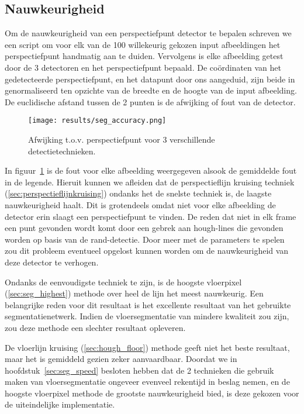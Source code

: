 \subsection{Nauwkeurigheid}
Om de nauwkeurigheid van een perspectiefpunt detector te bepalen schreven we een script om voor elk van de 100 willekeurig gekozen input afbeeldingen
het perspectiefpunt handmatig aan te duiden.
Vervolgens is elke afbeelding getest door de 3 detectoren en het perspectiefpunt bepaald.
De co\"{o}rdinaten van het gedetecteerde perspectiefpunt, en het datapunt door ons aangeduid, zijn beide in genormaliseerd ten opzichte van de breedte en de hoogte van de input afbeelding.
De euclidische afstand tussen de 2 punten is de afwijking of fout van de detector.

\begin{figure}[h]
    \centering
    \texttt{[image: results/seg\_accuracy.png]}
    \caption{Afwijking t.o.v. perspectiefpunt voor 3 verschillende detectietechnieken.}
    \label{fig:seg_accuracy}
\end{figure}

In figuur~\ref{fig:seg_accuracy} is de fout voor elke afbeelding weergegeven alsook de gemiddelde fout in de legende.
Hieruit kunnen we afleiden dat de perspectieflijn kruising techniek (\ref{sec:perspectieflijnkruising}) ondanks het de snelste techniek is, de laagste nauwkeurigheid haalt.
Dit is grotendeels omdat niet voor elke afbeelding de detector erin slaagt een perspectiefpunt te vinden. De reden dat niet in elk frame
een punt gevonden wordt komt door een gebrek aan hough-lines die gevonden worden op basis van de rand-detectie.
Door meer met de parameters te spelen zou dit probleem eventueel opgelost kunnen worden om de nauwkeurigheid van deze detector te verhogen.

Ondanks de eenvoudigste techniek te zijn, is de hoogste vloerpixel (\ref{sec:seg_highest}) methode over heel de lijn het meest nauwkeurig.
Een belangrijke reden voor dit resultaat is het excellente resultaat van het gebruikte segmentatienetwerk.
Indien de vloersegmentatie van mindere kwaliteit zou zijn, zou deze methode een slechter resultaat opleveren.

De vloerlijn kruising (\ref{sec:hough_floor}) methode geeft niet het beste resultaat, maar het is gemiddeld gezien zeker aanvaardbaar.
Doordat we in hoofdstuk~\ref{sec:seg_speed} besloten hebben dat de 2 technieken die gebruik maken van vloersegmentatie ongeveer evenveel rekentijd in beslag
nemen, en de hoogste vloerpixel methode de grootste nauwkeurigheid bied, is deze gekozen voor de uiteindelijke implementatie.


